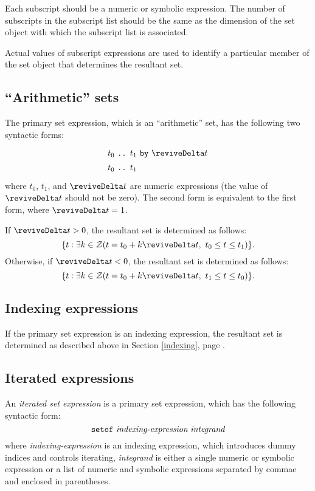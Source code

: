 \documentclass[11pt]{report}
\begin{document}
Each subscript should be a numeric or symbolic expression. The number
of subscripts in the subscript list should be the same as the dimension
of the set object with which the subscript list is associated.

Actual values of subscript expressions are used to identify a
particular member of the set object that determines the resultant set.

\subsection{``Arithmetic'' sets}

The primary set expression, which is an ``arithmetic'' set, has the
following two syntactic forms:
$$
{\def\arraystretch{1.4}
\begin{array}{l}
\mbox{$t_0$ {\tt..} $t_1$ {\tt by} $\reviveDelta t$}\\
\mbox{$t_0$ {\tt..} $t_1$}\\
\end{array}
}
$$
where $t_0$, $t_1$, and $\reviveDelta t$ are numeric expressions (the value
of $\reviveDelta t$ should not be zero). The second form is equivalent to the
first form, where $\reviveDelta t=1$.

If $\reviveDelta t>0$, the resultant set is determined as follows:
$$\{t:\exists k\in{\cal Z}(t=t_0+k\reviveDelta t,\ t_0\leq t\leq t_1)\}.$$
Otherwise, if $\reviveDelta t<0$, the resultant set is determined as follows:
$$\{t:\exists k\in{\cal Z}(t=t_0+k\reviveDelta t,\ t_1\leq t\leq t_0)\}.$$

\subsection{Indexing expressions}

If the primary set expression is an indexing expression, the resultant
set is determined as described above in Section \ref{indexing}, page
\pageref{indexing}.

\newpage

\subsection{Iterated expressions}

An {\it iterated set expression} is a primary set expression, which has
the following syntactic form:
$$\mbox{{\tt setof} {\it indexing-expression} {\it integrand}}$$
where {\it indexing-expression} is an indexing expression, which
introduces dummy indices and controls iterating, {\it integrand} is
either a single numeric or symbolic expression or a list of numeric and
symbolic expressions separated by commae and enclosed in parentheses.
\end{document}
